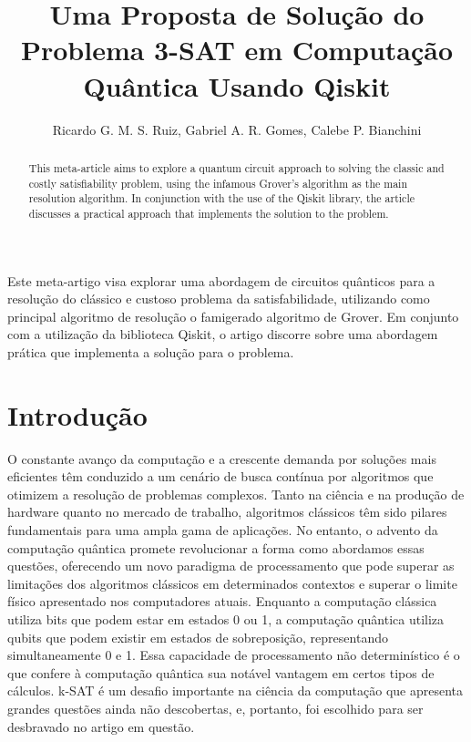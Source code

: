 \documentclass[12pt]{article}
\title{Uma Proposta de Solução do Problema 3-SAT em Computação Quântica Usando Qiskit}
\author{Ricardo G. M. S. Ruiz\inst{1}, Gabriel A. R. Gomes\inst{1}, Calebe P. Bianchini\inst{1}}
\begin{document}
\maketitle

\begin{abstract}
    This meta-article aims to explore a quantum circuit approach to solving the classic and costly satisfiability problem, using the infamous Grover’s algorithm as the main resolution algorithm. In conjunction with the use of the Qiskit library, the article discusses a practical approach that implements the solution to the problem.
\end{abstract} 
\begin{resumo} 
  Este meta-artigo visa explorar uma abordagem de circuitos quânticos para a resolução do clássico e custoso problema da satisfabilidade, utilizando como principal algoritmo de resolução o famigerado algoritmo de Grover. Em conjunto com a utilização da biblioteca Qiskit, o artigo discorre sobre uma abordagem prática que implementa a solução para o problema.
\end{resumo}


\section{Introdução}

O constante avanço da computação e a crescente demanda por soluções mais eficientes têm conduzido a um cenário de busca contínua por algoritmos que otimizem a resolução de problemas complexos. Tanto na ciência e na produção de hardware quanto no mercado de trabalho, algoritmos clássicos têm sido pilares fundamentais para uma ampla gama de aplicações. No entanto, o advento da computação quântica promete revolucionar a forma como abordamos essas questões, oferecendo um novo paradigma de processamento que pode superar as limitações dos algoritmos clássicos em determinados contextos e superar o limite físico apresentado nos computadores atuais. Enquanto a computação clássica utiliza bits que podem estar em estados 0 ou 1, a computação quântica utiliza qubits que podem existir em estados de sobreposição, representando simultaneamente 0 e 1. Essa capacidade de processamento não determinístico é o que confere à computação quântica sua notável vantagem em certos tipos de cálculos. k-SAT é um desafio importante na ciência da computação que apresenta grandes questões ainda não descobertas, e, portanto, foi escolhido para ser desbravado no artigo em questão.
\end{document}
